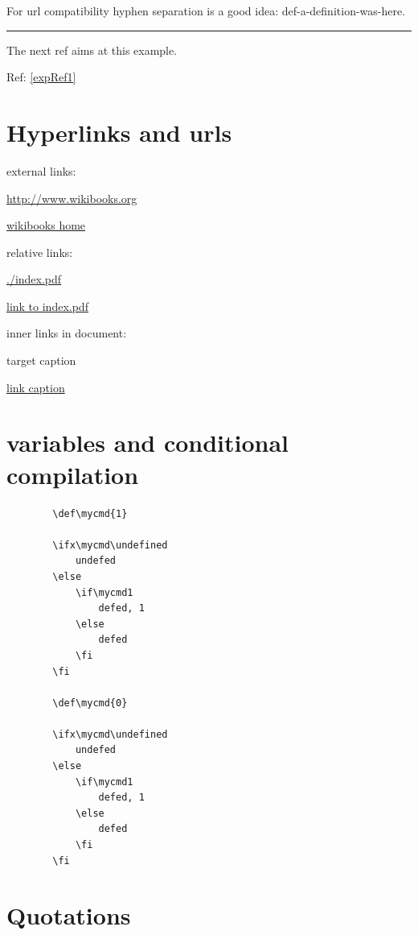 \documentclass[12pt]{article}
\newcommand{\inOut}[1]{#1}                                %
\begin{document}
    \begin{remark} \label{remLab2}
        For url compatibility hyphen separation is a good idea: def-a-definition-was-here.
    \end{remark}\hrule

    \begin{example} \label{expRef1}
        \inOut{
            The next ref aims at this example.

            Ref: \ref{expRef1}
        }
    \end{example}

\section{Hyperlinks and urls}\label{hyperlinks-urls}

    external links:

    \url{http://www.wikibooks.org}

    \href{http://www.wikibooks.org}{wikibooks home}

    relative links:

    \url{./index.pdf}

    \href{./index.pdf}{link to index.pdf}

    inner links in document:

    \hypertarget{label}{target caption}

    \hyperlink{label}{link caption}

    \section{variables and conditional compilation}

    \begin{lstlisting}
        \def\mycmd{1}

        \ifx\mycmd\undefined
            undefed
        \else
            \if\mycmd1
                defed, 1
            \else
                defed
            \fi
        \fi

        \def\mycmd{0}

        \ifx\mycmd\undefined
            undefed
        \else
            \if\mycmd1
                defed, 1
            \else
                defed
            \fi
        \fi
    \end{lstlisting}

\section{Quotations}\label{quotations}
\end{document}
